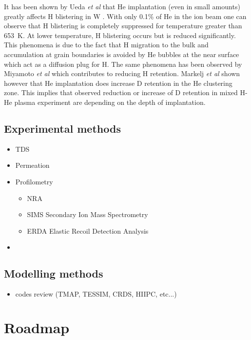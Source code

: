 It has been shown by Ueda \textit{et al} that He implantation (even in small amounts) greatly affects H blistering in W \cite{ueda_simultaneous_2009}.
With only 0.1\% of He in the ion beam one can observe that H blistering is completely suppressed for temperature greater than \SI{653}{K}.
At lower temperature, H blistering occurs but is reduced significantly.
This phenomena is due to the fact that H migration to the bulk and accumulation at grain boundaries is avoided by He bubbles at the near surface which act as a diffusion plug for H.
The same phenomena has been observed by Miyamoto \textit{et al} \cite{miyamoto_microscopic_2011} which contributes to reducing H retention.
Markelj \textit{et al} \cite{markelj_hydrogen_2017} shown however that He implantation does increase D retention in the He clustering zone.
This implies that observed reduction or increase of D retention in mixed H-He plasma experiment are depending on the depth of implantation.

\subsection{Experimental methods}
\begin{itemize}
    \item TDS
    \item Permeation
    \item Profilometry
    \begin{itemize}
        \item NRA
        \item SIMS Secondary Ion Mass Spectrometry
        \item ERDA Elastic Recoil Detection Analysis
    \end{itemize}
    \item 
\end{itemize}
\subsection{Modelling methods}
\begin{itemize}
    \item codes review (TMAP, TESSIM, CRDS, HIIPC, etc...)
\end{itemize}
\section{Roadmap}



